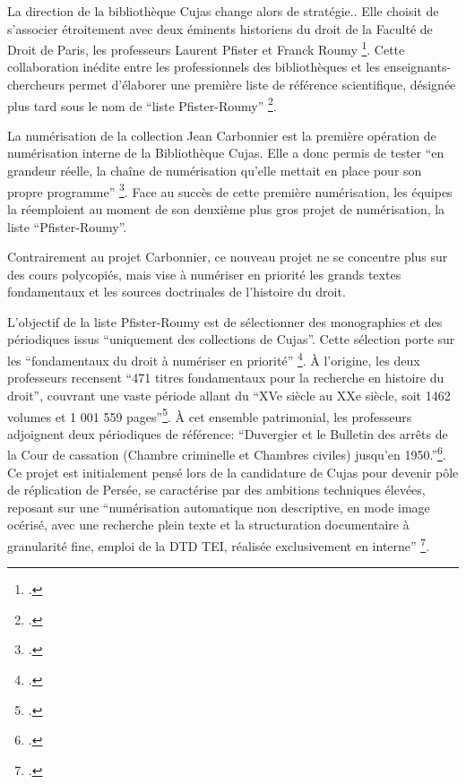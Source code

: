 La direction de la bibliothèque Cujas change alors de stratégie.. Elle choisit de s'associer étroitement avec deux éminents  historiens du droit de la Faculté de Droit de Paris, les professeurs Laurent Pfister et Franck Roumy \footcite{2006ProgrammeNumerisation}. Cette collaboration inédite entre les professionnels des bibliothèques et les enseignants-chercheurs permet d'élaborer une première liste de référence scientifique, désignée plus tard sous le nom de \enquote{liste Pfister-Roumy} \footcite{2007RefonteProgramme}.

La numérisation de la collection Jean Carbonnier est la première opération de numérisation interne de la Bibliothèque Cujas. Elle a donc permis de tester \enquote{en grandeur réelle, la chaîne de numérisation qu'elle mettait en place pour son propre programme} \footcite{2007RefonteProgramme}. Face au succès de cette première numérisation, les équipes la réemploient au moment de son deuxième plus gros projet de numérisation, la liste \enquote{Pfister-Roumy}.

Contrairement au projet Carbonnier, ce nouveau projet ne se concentre plus sur des cours polycopiés, mais vise à numériser en priorité  les grands textes fondamentaux et les sources doctrinales de l'histoire du droit.

L'objectif de la liste Pfister-Roumy est de sélectionner des monographies et des périodiques issus \enquote{uniquement des collections de Cujas}. Cette sélection porte sur les \enquote{fondamentaux du droit à numériser en priorité} \footcite{2006ProgrammeNumerisation}. À l'origine, les deux professeurs recensent \enquote{471 titres fondamentaux pour la recherche en histoire du droit}, couvrant une vaste période allant du \enquote{XVe siècle au XXe siècle, soit 1462 volumes et 1 001 559 pages}\footcite{2006ProgrammeNumerisation}. À cet ensemble patrimonial, les professeurs adjoignent deux périodiques de référence: \enquote{Duvergier et le Bulletin des arrêts de la Cour de cassation (Chambre criminelle et Chambres civiles) jusqu'en 1950.}\footcite{2006ProgrammeNumerisation}. Ce projet est initialement pensé lors de la candidature de Cujas pour devenir pôle de réplication de Persée, se caractérise par des ambitions techniques élevées, reposant sur une \enquote{numérisation automatique non descriptive, en mode image océrisé, avec une recherche plein texte et la structuration documentaire à granularité fine, emploi de la DTD TEI, réalisée exclusivement en interne} \footcite{2006ProgrammeNumerisation}.

